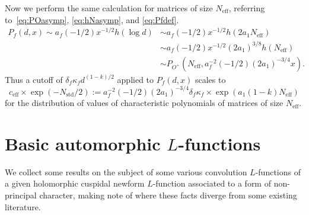 \documentclass[11pt,reqno]{amsart} \usepackage{fullpage}
\newcommand\be{\begin{equation}}
\newcommand\ee{\end{equation}}
\newcommand{\nstd}{N_{\text{std}}}
\newcommand{\neff}{N_{\text{eff}}}
\newcommand{\ceff}{c_{\text{eff}}}
\numberwithin{equation}{section}
\begin{document}
Now we perform the same calculation for matrices of size $\neff$, referring
to~\eqref{eq:POasymp}, \eqref{eq:hNasymp}, and \eqref{eq:Pfdef}.
\be\begin{aligned}
  P_f(d,x)\sim a_f(-1/2)x^{-1/2}h(\log d)
  &\sim a_f(-1/2)x^{-1/2}h(2a_1\neff) \\
  &\sim a_f(-1/2)x^{-1/2}(2a_1)^{3/8}h(\neff) \\
  &\sim P_{O^+}\left(\neff,a_f^{-2}(-1/2)(2a_1)^{-3/4}x\right).\end{aligned}\ee
Thus a cutoff of $\delta_f\kappa_fd^{(1-k)/2}$ applied to $P_f(d,x)$ scales to
\be\ceff\times\exp\left(-\nstd/2\right):=
a_f^{-2}(-1/2)(2a_1)^{-3/4}\delta_f\kappa_f\times\exp(a_1(1-k)\neff)\ee for the
distribution of values of characteristic polynomials of matrices of size $\neff$.

\section{Basic automorphic $L$-functions}\label{sec:automorphic}
We collect some results on the subject of some various convolution $L$-functions of a
given holomorphic cuspidal newform $L$-function associated to a form of non-principal
character, making note of where these facts diverge from some existing literature.
\end{document}
